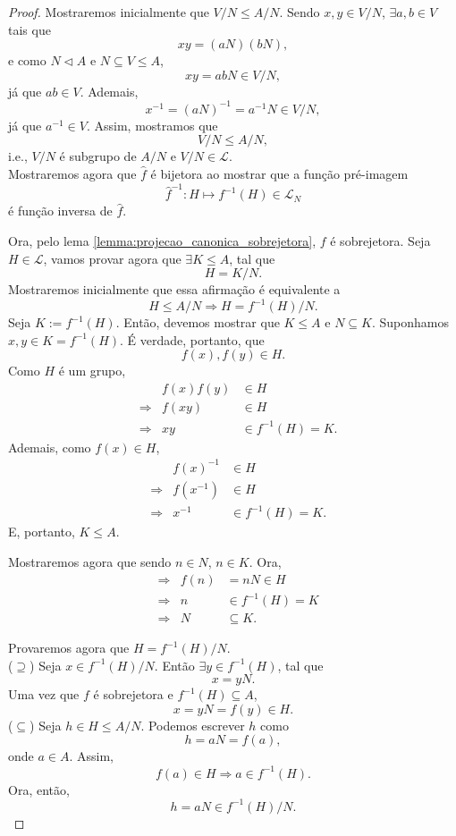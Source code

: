 \documentclass[11pt,openany]{book}
\begin{document}
     \begin{proof}
         Mostraremos inicialmente que $V/N \leq A/N$. Sendo $x, y \in V/N$, $\exists a, b \in V$ tais que
         \[xy = (aN)(bN),\]
         e como $N \triangleleft A$ e $N \subseteq V \leq A$,
         \[xy = abN \in V/N,\]
         já que $ab \in V$.
         Ademais, 
         \[x^{-1} = (aN)^{-1} = a^{-1}N \in V/N,\]
         já que $a^{-1} \in V$.
         Assim, mostramos que
         \[V/N \leq A/N,\]
         i.e., $V/N$ é subgrupo de $A/N$ e $V/N \in \mathcal{L}$.\\
         Mostraremos agora que $\hat{f}$ é bijetora ao mostrar que a função pré-imagem \[\hat{f}^{-1}: H \mapsto f^{-1}(H) \in \mathcal{L}_N\] é função inversa de $\hat{f}$. 
         
         Ora,
         pelo lema \ref{lemma:projecao_canonica_sobrejetora}, $f$ é sobrejetora. Seja $H \in \mathcal{L}$, vamos provar agora que $\exists K \leq A$, tal que
         \[H = K/N.\]
         Mostraremos inicialmente que essa afirmação é equivalente a
         \[H \leq A/N \Rightarrow H = f^{-1}(H)/N.\]
         Seja $K := f^{-1}(H)$. Então, devemos mostrar que $K \leq A$ e $N \subseteq K$. Suponhamos $x, y \in K = f^{-1}(H)$. É verdade, portanto, que
         \[f(x), f(y) \in H.\]
         Como $H$ é um grupo,
         \begin{align*}
             & & f(x)f(y) &\in H\\
             &\Rightarrow & f(xy) &\in H\\
             &\Rightarrow & xy &\in f^{-1}(H) = K.
         \end{align*}
         Ademais, como $f(x) \in H$,
         \begin{align*}
             & & f(x)^{-1} &\in H\\
             &\Rightarrow & f(x^{-1}) &\in H\\
             &\Rightarrow & x^{-1} &\in f^{-1}(H) = K.
         \end{align*}
         E, portanto, $K \leq A$.

        Mostraremos agora que sendo $n \in N$, $n \in K$. Ora,
        \begin{align*}
            &\Rightarrow & f(n) &= nN \in H\\
            &\Rightarrow & n &\in f^{-1}(H) = K\\
            &\Rightarrow & N &\subseteq K.
        \end{align*}

        Provaremos agora que $H = f^{-1}(H)/N$.\\
        ($\supseteq$) Seja $x \in f^{-1}(H)/N$. Então $\exists y \in f^{-1}(H)$, tal que
        \[x = yN.\]
        Uma vez que $f$ é sobrejetora e $f^{-1}(H) \subseteq A$,
        \[x = yN = f(y) \in H.\]
        ($\subseteq$) Seja $h \in H \leq A/N$. Podemos escrever $h$ como
        \[h = aN = f(a),\]
        onde $a \in A$. Assim,
        \[f(a) \in H \Rightarrow a \in f^{-1}(H).\]
        Ora, então,
        \[h = aN \in f^{-1}(H)/N.\]
         

\end{proof}
\end{document}
